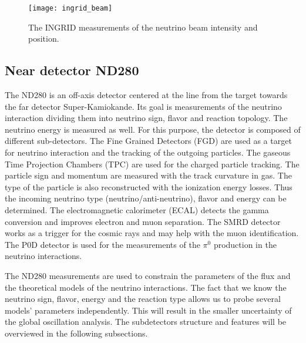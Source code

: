 \documentclass[../main.tex]{subfiles}
\begin{document}
\begin{figure}[!ht]
  \centering
  \texttt{[image: ingrid\_beam]}
  \caption{The INGRID measurements of the neutrino beam intensity and position.}
  \label{fig:t2k:ingrid_beam}
\end{figure}

\subsection{Near detector ND280}
\label{sec:T2K:nd280}
The ND280 is an off-axis detector centered at the line from the target towards the far detector Super-Kamiokande. Its goal is measurements of the neutrino interaction dividing them into neutrino sign, flavor and reaction topology. The neutrino energy is measured as well. For this purpose, the detector is composed of different sub-detectors. The Fine Grained Detectors (FGD) are used as a target for neutrino interaction and the tracking of the outgoing particles. The gaseous Time Projection Chambers (TPC) are used for the charged particle tracking. The particle sign and momentum are measured with the track curvature in gas. The type of the particle is also reconstructed with the ionization energy losses. Thus the incoming neutrino type (neutrino/anti-neutrino), flavor and energy can be determined. The electromagnetic calorimeter (ECAL) detects the gamma conversion and improves electron and muon separation. The SMRD detector works as a trigger for the cosmic rays and may help with the muon identification. The P0D detector is used for the measurements of the $\pi^0$ production in the neutrino interactions.

The ND280 measurements are used to constrain the parameters of the flux and the theoretical models of the neutrino interactions. The fact that we know the neutrino sign, flavor, energy and the reaction type allows us to probe several models' parameters independently. This will result in the smaller uncertainty of the global oscillation analysis. The subdetectors structure and features will be overviewed in the following subsections.
\end{document}
